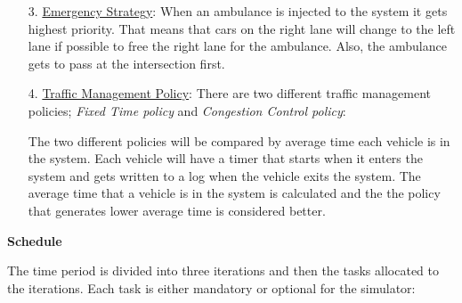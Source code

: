 \documentclass[11pt]{article}
\begin{document}
\begin{description}
\begin{itemize}
		\item[3. ] \underline{Emergency Strategy}: When an ambulance is injected to the system it gets highest priority. That means that cars on the right lane will change to the left lane if possible to free the right lane for the ambulance. Also, the ambulance gets to pass at the intersection first.

		\item[4. ] \underline{Traffic Management Policy}: There are two different traffic management policies; \textit{Fixed Time policy} and \textit{Congestion Control policy}:

		
The two different policies will be compared by average time each vehicle is in the system. Each vehicle will have a timer that starts when it enters the system and gets written to a log when the vehicle exits the system. The average time that a vehicle is in the system is calculated and the the policy that generates lower average time is considered better.
		 		
		
	\end{itemize}
\end{description}

\textbf{Schedule}

The time period is divided into three iterations and then the tasks allocated to the iterations. Each task is either mandatory or optional for the simulator:
\end{document}
